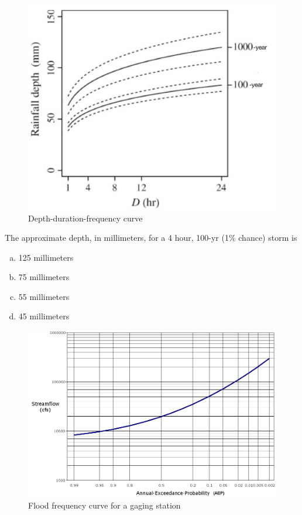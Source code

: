 \documentclass[12pt]{article}
\begin{document}
\begin{enumerate}
\begin{figure}[h!] %
   \centering
   \includegraphics[width=6in]{ddf-curve.jpg} 
   \caption{Depth-duration-frequency curve}
   \label{fig:ddf-curve.jpg}
\end{figure}

The approximate depth, in millimeters, for a 4 hour, 100-yr (1\% chance) storm is 
\begin{enumerate}[a)]
\item 125 millimeters
\item 75 millimeters
\item 55 millimeters
\item 45 millimeters
\end{enumerate}
\clearpage



\begin{figure}[h!] %
   \centering
   \includegraphics[width=6in]{flood-frequency-curve.jpg} 
   \caption{Flood frequency curve for a gaging station}
   \label{fig:flood-frequency-curve.jpg}
\end{figure}


\end{enumerate}
\end{document}
